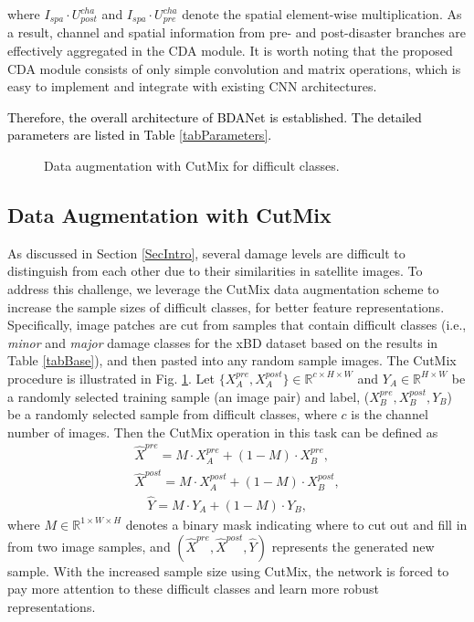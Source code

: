 \documentclass[journal]{IEEEtran}
\begin{document}
where $I_{spa}\cdot U_{post}^{cha}$ and $I_{spa}\cdot U_{pre}^{cha}$ denote the spatial element-wise multiplication. As a result, channel and spatial information from pre- and post-disaster branches are effectively aggregated in the CDA module.
It is  worth noting that the proposed CDA module consists of only simple convolution and matrix operations, which is easy to implement and integrate with existing CNN architectures. 

\textcolor{black}{Therefore, the overall architecture of BDANet is established. The detailed parameters are listed in Table \ref{tabParameters}.}

\begin{figure}[h]
	\centering
	\caption{Data augmentation with CutMix for difficult classes.}
	\label{figCutmix}
\end{figure}

\subsection{Data Augmentation with CutMix} 
As discussed in Section \ref{SecIntro}, several damage levels are difficult to distinguish from each other due to their similarities in satellite images. To address this challenge, we leverage the CutMix \cite{yun2019cutmix} data augmentation scheme to increase the sample sizes of difficult classes, for better feature representations.  
Specifically, image patches are cut from samples that contain difficult classes (i.e., \textit{minor} and \textit{major} damage classes for the xBD dataset based on the results in Table \ref{tabBase}), and then pasted into any random sample images. The CutMix procedure is illustrated in Fig. \ref{figCutmix}. Let $\{X_A^{pre}, X_A^{post}\}  \in \mathbb{R}^{c\times H\times W}$ and $Y_A \in \mathbb{R}^{H\times W}$ be a randomly selected training sample (an image pair) and label, ($X_B^{pre}, X_B^{post}, Y_B$) be a randomly selected sample from difficult classes, where $c$ is the channel number of images. Then the CutMix operation in this task can be defined as
\begin{equation}
\begin{aligned}
\hat{X}^{pre} = M\cdot X_A^{pre} + (1-M) \cdot X_B^{pre} , \\
\hat{X}^{post} = M\cdot X_A^{post} + (1-M) \cdot X_B^{post}, \\
\quad \hat{Y} = M\cdot Y_A + (1-M) \cdot Y_B,  
\end{aligned}
\label{eqConv1}
\end{equation}
where $M\in \mathbb{R}^{1\times W\times H} $ denotes a binary mask indicating where to cut out and fill in from two image samples,  and $(\hat{X}^{pre}, \hat{X}^{post}, \hat{Y})$ represents the generated new sample. With the increased sample size using CutMix, the network is forced to pay more attention to these difficult classes and learn more robust representations.
\end{document}
